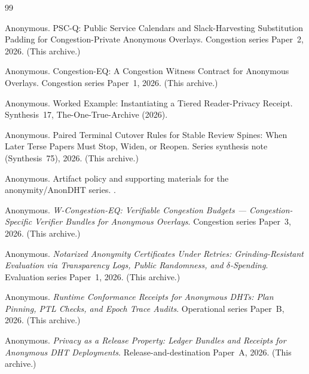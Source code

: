 \documentclass[11pt]{article}
\theoremstyle{definition}
\theoremstyle{remark}
\begin{document}
\begin{thebibliography}{99}

Anonymous.
\newblock PSC-Q: Public Service Calendars and Slack-Harvesting Substitution Padding for Congestion-Private Anonymous Overlays.
\newblock Congestion series Paper~2, 2026. (This archive.)

Anonymous.
\newblock Congestion-EQ: A Congestion Witness Contract for Anonymous Overlays.
\newblock Congestion series Paper~1, 2026. (This archive.)

Anonymous.
\newblock Worked Example: Instantiating a Tiered Reader-Privacy Receipt.
\newblock Synthesis~17, The-One-True-Archive (2026).

Anonymous.
\newblock Paired Terminal Cutover Rules for Stable Review Spines: When Later Terse Papers Must Stop, Widen, or Reopen.
\newblock Series synthesis note (Synthesis~75), 2026. (This archive.)

Anonymous.
\newblock Artifact policy and supporting materials for the anonymity/AnonDHT series.
.

Anonymous.
\newblock \emph{W-Congestion-EQ: Verifiable Congestion Budgets --- Congestion-Specific Verifier Bundles for Anonymous Overlays}.
\newblock Congestion series Paper~3, 2026. (This archive.)

Anonymous.
\newblock \emph{Notarized Anonymity Certificates Under Retries: Grinding-Resistant Evaluation via Transparency Logs, Public Randomness, and $\delta$-Spending}.
\newblock Evaluation series Paper~1, 2026. (This archive.)

Anonymous.
\newblock \emph{Runtime Conformance Receipts for Anonymous DHTs: Plan Pinning, PTL Checks, and Epoch Trace Audits}.
\newblock Operational series Paper~B, 2026. (This archive.)

Anonymous.
\newblock \emph{Privacy as a Release Property: Ledger Bundles and Receipts for Anonymous DHT Deployments}.
\newblock Release-and-destination Paper~A, 2026. (This archive.)
\end{thebibliography}
\end{document}
